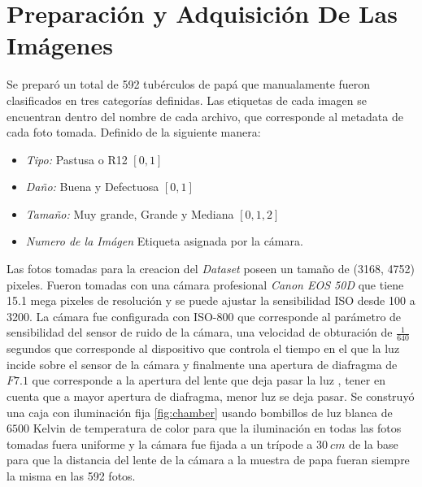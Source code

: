 \section{Preparación y Adquisición De Las Imágenes}

	Se preparó un total de 592 tubérculos de papá que manualamente fueron clasificados en tres categorías definidas. Las etiquetas de cada imagen se encuentran dentro del nombre de cada archivo, que corresponde al metadata de cada foto tomada. Definido de la siguiente manera:
	
	\begin{itemize}
		\item \textit{Tipo:} Pastusa o R12 $[0,1]$
		\item \textit{Daño:} Buena y Defectuosa $[0,1]$
		\item \textit{Tamaño:} Muy grande, Grande y Mediana $[0,1,2]$
		\item \textit{Numero de la Imágen} Etiqueta asignada por la cámara.
	\end{itemize}	
	
	Las fotos tomadas para la creacion del \textit{Dataset} poseen un tamaño de (3168, 4752) pixeles. Fueron tomadas con una cámara profesional \textit{Canon EOS 50D} que tiene 15.1 mega pixeles de resolución y se puede ajustar la sensibilidad ISO desde 100 a 3200. La cámara fue configurada con ISO-800 que corresponde al parámetro de sensibilidad del sensor de ruido de la cámara, una velocidad de obturación de $\frac{1}{640}$ segundos que corresponde al dispositivo que controla el tiempo en el que la luz incide sobre el sensor de la cámara y finalmente una apertura de diafragma de $F7.1$ que corresponde a la apertura del lente que deja pasar la luz \cite{Camara}, tener en cuenta que a mayor apertura de diafragma, menor luz se deja pasar. Se construyó una caja con iluminación fija \ref{fig:chamber} usando bombillos de luz blanca de $6500$ Kelvin de temperatura de color para que la iluminación en todas las fotos tomadas fuera uniforme y la cámara fue fijada a un trípode a $30 \ cm$ de la base para que la distancia del lente de la cámara a la muestra de papa fueran siempre la misma en las 592 fotos.

